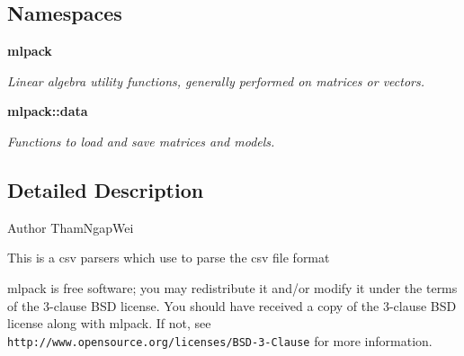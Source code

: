 \subsection*{Namespaces}
\begin{DoxyCompactItemize}
\item 
 \textbf{ mlpack}
\begin{DoxyCompactList}\small\item\em Linear algebra utility functions, generally performed on matrices or vectors. \end{DoxyCompactList}\item 
 \textbf{ mlpack\+::data}
\begin{DoxyCompactList}\small\item\em Functions to load and save matrices and models. \end{DoxyCompactList}\end{DoxyCompactItemize}


\subsection{Detailed Description}
\begin{DoxyAuthor}{Author}
Tham\+Ngap\+Wei
\end{DoxyAuthor}
This is a csv parsers which use to parse the csv file format

mlpack is free software; you may redistribute it and/or modify it under the terms of the 3-\/clause B\+SD license. You should have received a copy of the 3-\/clause B\+SD license along with mlpack. If not, see {\tt http\+://www.\+opensource.\+org/licenses/\+B\+S\+D-\/3-\/\+Clause} for more information. 